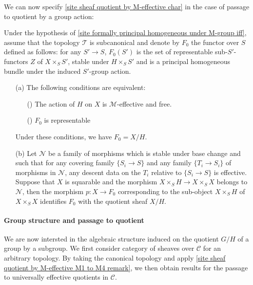 We can now specify \cref{site sheaf quotient by M-effective char} in the case of passage to quotient by a group action:
\begin{proposition}\label{site sheaf quotient by M-effective free group action char}
Under the hypothesis of \cref{site formally principal homogeneous under M-group iff}, assume that the topology $\mathcal{T}$ is subcanonical and denote by $F_0$ the functor over $S$ defined as follows: for any $S'\to S$, $F_0(S')$ is the set of representable sub-$S'$-functors $Z$ of $X\times_SS'$, stable under $H\times_SS'$ and is a principal homogeneous bundle under the induced $S'$-group action.
\begin{enumerate}
    \item[(a)] The following conditions are equivalent:
    \begin{enumerate}
        \item[(\rmnum{1})] The action of $H$ on $X$ is $\mathcal{M}$-effective and free.
        \item[(\rmnum{2})] $F_0$ is representable 
    \end{enumerate}
    Under these conditions, we have $F_0=X/H$.
    \item[(b)] Let $\mathcal{N}$ be a family of morphisms which is stable under base change and such that for any covering family $\{S_i\to S\}$ and any family $\{T_i\to S_i\}$ of morphisms in $\mathcal{N}$, any descent data on the $T_i$ relative to $\{S_i\to S\}$ is effective. Suppose that $X$ is squarable and the morphism $X\times_SH\to X\times_SX$ belongs to $\mathcal{N}$, then the morphism $p:X\to F_0$ corresponding to the sub-object $X\times_SH$ of $X\times_SX$ identifies $F_0$ with the quotient sheaf $X/H$.
\end{enumerate}
\end{proposition}

\paragraph{Group structure and passage to quotient}
We are now intersted in the algebraic structure induced on the quotient $G/H$ of a group by a subgroup. We first consider category of sheaves over $\mathcal{C}$ for an arbitrary topology. By taking the canonical topology and apply \cref{site sheaf quotient by M-effective M1 to M4 remark}, we then obtain results for the passage to universally effective quotients in $\mathcal{C}$.

